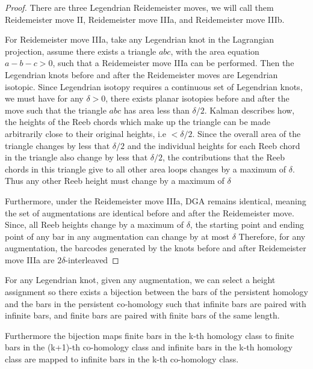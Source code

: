 \documentclass[11pt,oneside]{amsart}
\begin{document}
\begin{proof}

There are three Legendrian Reidemeister moves, we will call them Reidemeister move II, Reidemeister move IIIa, and Reidemeister move IIIb.

For Reidemeister move IIIa, take any Legendrian knot in the Lagrangian projection, assume there exists a triangle $abc$, with the area equation $a-b-c > 0$, such that a Reidemeister move IIIa can be performed. Then the Legendrian knots before and after the Reidemeister moves are Legendrian isotopic. Since Legendrian isotopy requires a continuous set of Legendrian knots, we must have for any $\delta > 0$, there exists planar isotopies before and after the move such that the triangle $abc$ has area less than $\delta/2$. Kalman describes how, the heights of the Reeb chords which make up the triangle can be made arbitrarily close to their original heights, i.e $< \delta/2$. Since the overall area of the triangle changes by less that $\delta/2$ and the individual heights for each Reeb chord in the triangle also change by less that $\delta/2$, the contributions that the Reeb chords in this triangle give to all other area loops changes by a maximum of $\delta$. Thus any other Reeb height must change by a maximum of $\delta$

Furthermore, under the Reidemeister move IIIa, DGA remains identical, meaning the set of augmentations are identical before and after the Reidemeister move. Since, all Reeb heights change by a maximum of $\delta$, the starting point and ending point of any bar in any augmentation can change by at most $\delta$ Therefore, for any augmentation, the barcodes generated by the knots before and after Reidemeister move IIIa are $2\delta$-interleaved 
    
\end{proof}

\begin{theorem}

For any Legendrian knot, given any augmentation, we can select a height assignment so there exists a bijection between the bars of the persistent homology and the bars in the persistent co-homology such that infinite bars are paired with infinite bars, and finite bars are paired with finite bars of the same length.

Furthermore the bijection maps finite bars in the k-th homology class to finite bars in the (k+1)-th co-homology class and infinite bars in the k-th homology class are mapped to infinite bars in the k-th co-homology class.

\end{theorem}
\end{document}
